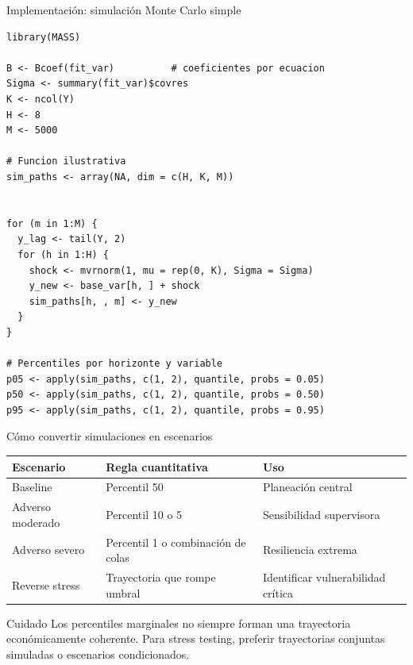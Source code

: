 \documentclass[10pt,aspectratio=169]{beamer}
\begin{document}
\begin{frame}[fragile]{Implementación: simulación Monte Carlo simple}
\begin{lstlisting}
library(MASS)

B <- Bcoef(fit_var)          # coeficientes por ecuacion
Sigma <- summary(fit_var)$covres
K <- ncol(Y)
H <- 8
M <- 5000

# Funcion ilustrativa
sim_paths <- array(NA, dim = c(H, K, M))


for (m in 1:M) {
  y_lag <- tail(Y, 2)
  for (h in 1:H) {
    shock <- mvrnorm(1, mu = rep(0, K), Sigma = Sigma)
    y_new <- base_var[h, ] + shock
    sim_paths[h, , m] <- y_new
  }
}

# Percentiles por horizonte y variable
p05 <- apply(sim_paths, c(1, 2), quantile, probs = 0.05)
p50 <- apply(sim_paths, c(1, 2), quantile, probs = 0.50)
p95 <- apply(sim_paths, c(1, 2), quantile, probs = 0.95)
\end{lstlisting}
\end{frame}

\begin{frame}{Cómo convertir simulaciones en escenarios}
\begin{table}
\small
\begin{tabular}{lll}
\toprule
Escenario & Regla cuantitativa & Uso \\
\midrule
Baseline & Percentil 50 & Planeación central \\
Adverso moderado & Percentil 10 o 5 & Sensibilidad supervisora \\
Adverso severo & Percentil 1 o combinación de colas & Resiliencia extrema \\
Reverse stress & Trayectoria que rompe umbral & Identificar vulnerabilidad crítica \\
\bottomrule
\end{tabular}
\end{table}

\begin{block}{Cuidado}
Los percentiles marginales no siempre forman una trayectoria económicamente coherente. Para stress testing, preferir trayectorias conjuntas simuladas o escenarios condicionados.
\end{block}
\end{frame}
\end{document}
